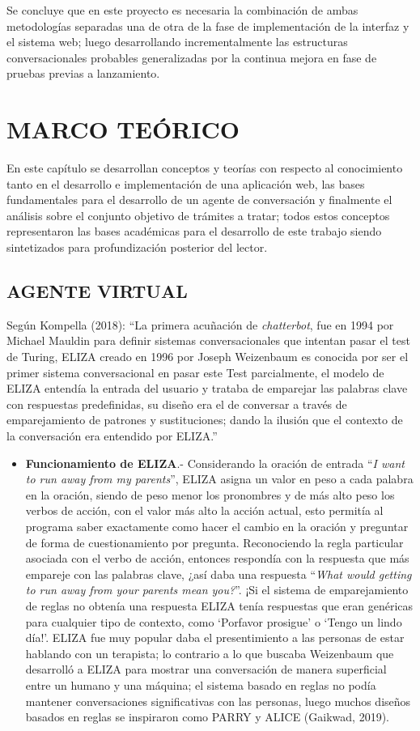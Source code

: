 \documentclass[letter, openright, 12pt]{book}
\begin{document}
Se concluye que en este proyecto es necesaria la combinación de ambas metodologías separadas una de otra de la fase de implementación de la interfaz y el sistema web; luego desarrollando incrementalmente las estructuras conversacionales probables generalizadas por la continua mejora en fase de pruebas previas a lanzamiento. 


\chapter{MARCO TEÓRICO}

En este capítulo se desarrollan conceptos y teorías con respecto al conocimiento tanto en el desarrollo e implementación de una aplicación web, las bases fundamentales para el desarrollo de un agente de conversación y finalmente el análisis sobre el conjunto objetivo de trámites a tratar; todos estos conceptos representaron las bases académicas para el desarrollo de este trabajo siendo sintetizados para profundización posterior del lector.

\section{AGENTE VIRTUAL}
Según Kompella (2018): “La primera acuñación de \textit{chatterbot}, fue en 1994 por Michael Mauldin para definir sistemas conversacionales que intentan pasar el test de Turing, ELIZA creado en 1996 por Joseph Weizenbaum es conocida por ser el primer sistema conversacional en pasar  este Test parcialmente, el modelo de ELIZA entendía la entrada del usuario y trataba de emparejar las palabras clave con respuestas predefinidas, su diseño era el de conversar a través de emparejamiento de patrones y sustituciones; dando la ilusión que el contexto de la conversación era entendido por ELIZA.”

\begin{itemize}
\item \textbf{Funcionamiento de ELIZA}.- Considerando la oración de entrada “\textit{I want to run away from my parents}”, ELIZA asigna un valor en peso a cada palabra en la oración, siendo de peso menor los pronombres y de más alto peso los verbos de acción, con el valor más alto la acción actual, esto permitía al programa saber exactamente como hacer el cambio en la oración y preguntar de forma de cuestionamiento por pregunta. Reconociendo la regla particular asociada con el verbo de acción, entonces respondía con la respuesta que más empareje con las palabras clave, ¿así daba una respuesta “\textit{What would getting to run away from your parents mean you?}”. ¡Si el sistema de emparejamiento de reglas no obtenía una respuesta ELIZA tenía respuestas que eran genéricas para cualquier tipo de contexto, como ‘Porfavor prosigue’ o ‘Tengo un lindo día!’. ELIZA fue muy popular daba el presentimiento a las personas de estar hablando con un terapista; lo contrario a lo que buscaba Weizenbaum que desarrolló a ELIZA para mostrar una conversación de manera superficial entre un humano y una máquina; el sistema basado en reglas no podía mantener conversaciones significativas con las personas, luego muchos diseños basados en reglas se inspiraron como PARRY y ALICE (Gaikwad, 2019).
\end{itemize}
\end{document}
